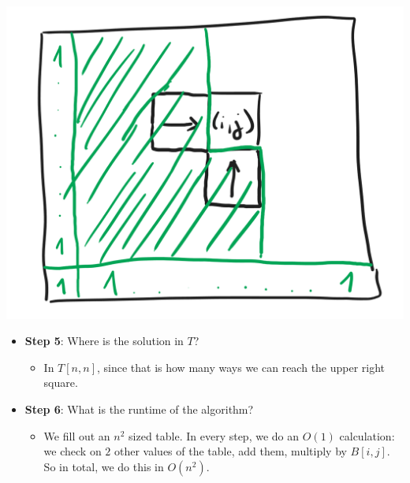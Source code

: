 \begin{center}
\includegraphics[width=\linewidth]{10/05/chess_order.png}
\end{center}

\begin{itemize}
    \item \textbf{Step 5}: Where is the solution in $T$?
    \begin{itemize}
        \item In $T[n,n]$, since that is how many ways we can reach the upper right square.
    \end{itemize}
    \item \textbf{Step 6}: What is the runtime of the algorithm?
    \begin{itemize}
        \item We fill out an $n^2$ sized table. In every step, we do an $O(1)$ calculation: we check on $2$ other values of the table, add them, multiply by $B[i,j]$. So in total, we do this in $O(n^2)$.
    \end{itemize}
    
\end{itemize}

